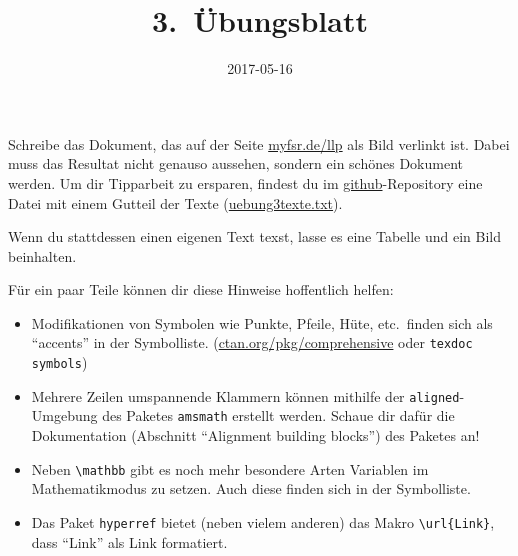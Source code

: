 \documentclass{latex-htw-uebung}
\title{3.\ Übungsblatt}
\date{2017-05-16}
\begin{document}
Schreibe das Dokument, das auf der Seite \url{myfsr.de/llp} als Bild verlinkt ist. Dabei muss das Resultat nicht genauso aussehen, sondern ein schönes Dokument werden. Um dir Tipparbeit zu ersparen, findest du im \url{github}-Repository eine Datei mit einem Gutteil der Texte (\url{uebung3texte.txt}).

Wenn du stattdessen einen eigenen Text texst, lasse es eine Tabelle und ein Bild beinhalten.

Für ein paar Teile können dir diese Hinweise hoffentlich helfen:
\begin{itemize}
  \item Modifikationen von Symbolen wie Punkte, Pfeile, Hüte, etc.\ finden sich als \enquote{accents} in der Symbolliste. (\url{ctan.org/pkg/comprehensive} oder \lstinline!texdoc symbols!)
  \item Mehrere Zeilen umspannende Klammern können mithilfe der \lstinline!aligned!-Umgebung des Paketes \lstinline!amsmath! erstellt werden. Schaue dir dafür die Dokumentation (Abschnitt \enquote{Alignment building blocks}) des Paketes an!
  \item Neben \lstinline!\mathbb! gibt es noch mehr besondere Arten Variablen im Mathematikmodus zu setzen. Auch diese finden sich in der Symbolliste.
  \item Das Paket \lstinline!hyperref! bietet (neben vielem anderen) das Makro \lstinline!\url{Link}!, dass \enquote{Link} als Link formatiert.
\end{itemize}
\end{document}
